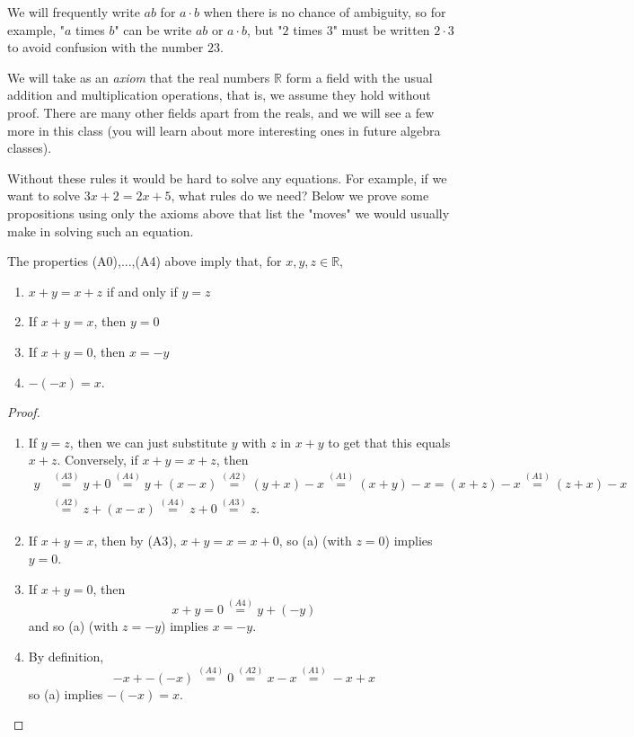 \documentclass[11pt,dvipsnames]{book}
\numberwithin{figure}{section} %
\numberwithin{table}{section} %
\begin{document}
We will frequently write $ab$ for $a\cdot b$ when there is no chance of ambiguity, so for example, "$a$ times $b$" can be write $ab$ or $a\cdot b$, but "$2$ times $3$" must be written $2\cdot 3$ to avoid confusion with the number $23$.

We will take as an {\it axiom} that the real numbers $\mathbb{R}$ form a field with the usual addition and multiplication operations, that is, we assume they hold without proof.  There are many other fields apart from the reals, and we will see a few more in this class (you will learn about more interesting ones in future algebra classes).

Without these rules it would be hard to solve any equations. For example, if we want to solve $3x+2=2x+5$, what rules do we need? Below we prove some propositions using only the axioms above that list the "moves" we would usually make in solving such an equation.

\begin{proposition}
\label{p:field-consequences}
The properties (A0),...,(A4) above imply that, for $x,y,z\in \mathbb{R}$,
\begin{enumerate}[label=(\alph*)]
\item $x+y=x+z$ if and only if $y=z$
\item If $x+y=x$, then $y=0$
\item If $x+y=0$, then $x=-y$
\item $-(-x)=x$.
\end{enumerate}
\end{proposition}

\begin{proof}
\begin{enumerate}[label=(\alph*)]
\item If $y=z$, then we can just substitute $y$ with $z$ in $x+y$ to get that this equals $x+z$. Conversely, if $x+y=x+z$, then
\begin{align*}
y
& \stackrel{(A3)}{=}y+0\stackrel{(A4)}{=}y+(x-x)\stackrel{(A2)}{=}(y+x)-x\stackrel{(A1)}{=}(x+y)-x
=(x+z)-x\stackrel{(A1)}{=}(z+x)-x\\
& 
\stackrel{(A2)}{=}z+(x-x)
\stackrel{(A4)}{=}z+0
\stackrel{(A3)}{=}z.
\end{align*}

\item If $x+y=x$, then by (A3), $x+y=x=x+0$, so (a) (with $z=0$) implies $y=0$.
\item If $x+y=0$, then
\[
x+y=0 \stackrel{(A4)}{=}y+(-y)
\]
and so (a) (with $z=-y$) implies $x=-y$.

\item By definition, 
\[
-x+-(-x)\stackrel{(A4)}{=}
0\stackrel{(A2)}{=}x-x
\stackrel{(A1)}{=}-x+x
\]
so (a) implies $-(-x)=x$. 
\end{enumerate}
\end{proof}
\end{document}
